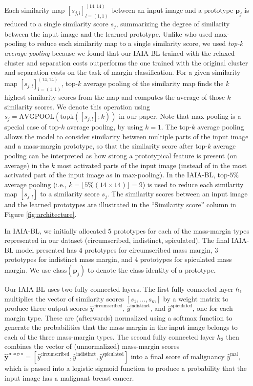 \documentclass[11pt]{article}
\begin{document}
Each similarity map $[s_{j,l}]_{l=(1,1)}^{(14,14)}$ between an input image and a prototype $\mathbf{p}_j$ is reduced to a single similarity score $s_j$, summarizing the degree of similarity between the input image and the learned prototype. Unlike \cite{PPNet} who used max-pooling to reduce each similarity map to a single similarity score, we used \textit{top-k average pooling} \citep[e.g., as in][]{kalchbrenner2014convolutional} because we found that our IAIA-BL trained with the relaxed cluster and separation costs outperforms the one trained with the original cluster and separation costs on the task of margin classification. For a given similarity map $[s_{j,l}]_{l=(1,1)}^{(14,14)}$, top-$k$ average pooling of the similarity map finds the $k$ highest similarity scores from the map and computes the average of those $k$ similarity scores. We denote this operation using $s_j = \text{AVGPOOL}({\text{topk}}([s_{j,l}]; k))$ in our paper. Note that max-pooling is a special case of top-$k$ average pooling, by using $k=1$. The top-$k$ average pooling allows the model to consider similarity between multiple parts of the input image and a mass-margin prototype, so that the similarity score after top-$k$ average pooling can be interpreted as how strong a prototypical feature is present (on average) in the $k$ most activated parts of the input image (instead of in the most activated part of the input image as in max-pooling). In the IAIA-BL, top-$5\%$ average pooling (i.e., $k=\lfloor5\%(14 \times 14)\rfloor=9$) is used to reduce each similarity map $[s_{j,l}]$ to a similarity score $s_j$. The similarity scores between an input image and the learned prototypes are illustrated in the ``Similarity score'' column in Figure \ref{fig:architecture}.

In IAIA-BL, we initially allocated $5$ prototypes for each of the mass-margin types represented in our dataset (circumscribed, indistinct, spiculated). The final IAIA-BL model presented has 4 prototypes for circumscribed mass margin, 3 prototypes for indistinct mass margin, and 4 prototypes for spiculated mass margin. We use $\text{class}(\mathbf{p}_j)$ to denote the class identity of a prototype.

Our IAIA-BL uses two fully connected layers. The first fully connected layer $h_1$ multiplies the vector of similarity scores $[s_1, ..., s_m]$ by a weight matrix to produce three output scores $\hat{y}^{\text{circumscribed}}$, $\hat{y}^{\text{indistinct}}$, and $\hat{y}^{\text{spiculated}}$, one for each margin type. These are (afterwards) normalized using a softmax function to generate the probabilities that the mass margin in the input image belongs to each of the three mass-margin types. The second fully connected layer $h_2$ then combines the vector of (unnormalized) mass-margin scores $\hat{\mathbf{y}}^{\text{margin}}=[\hat{y}^{\text{circumscribed}}, \hat{y}^{\text{indistinct}}, \hat{y}^{\text{spiculated}}]$ into a final score of malignancy $\hat{y}^{\text{mal}}$, which is passed into a logistic sigmoid function to produce a probability that the input image has a malignant breast cancer.
\end{document}
